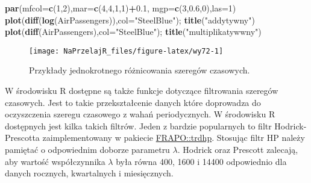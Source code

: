 \documentclass[polish,]{book}
\newenvironment{Shaded}{\begin{snugshade}}{\end{snugshade}}
\newcommand{\DataTypeTok}[1]{\textcolor[rgb]{0.13,0.29,0.53}{#1}}
\newcommand{\DecValTok}[1]{\textcolor[rgb]{0.00,0.00,0.81}{#1}}
\newcommand{\FloatTok}[1]{\textcolor[rgb]{0.00,0.00,0.81}{#1}}
\newcommand{\KeywordTok}[1]{\textcolor[rgb]{0.13,0.29,0.53}{\textbf{#1}}}
\newcommand{\NormalTok}[1]{#1}
\newcommand{\OperatorTok}[1]{\textcolor[rgb]{0.81,0.36,0.00}{\textbf{#1}}}
\newcommand{\StringTok}[1]{\textcolor[rgb]{0.31,0.60,0.02}{#1}}
\begin{document}
\begin{Shaded}
\begin{Highlighting}[]
\KeywordTok{par}\NormalTok{(}\DataTypeTok{mfcol=}\KeywordTok{c}\NormalTok{(}\DecValTok{1}\NormalTok{,}\DecValTok{2}\NormalTok{),}\DataTypeTok{mar=}\KeywordTok{c}\NormalTok{(}\DecValTok{4}\NormalTok{,}\DecValTok{4}\NormalTok{,}\DecValTok{1}\NormalTok{,}\DecValTok{1}\NormalTok{)}\OperatorTok{+}\FloatTok{0.1}\NormalTok{, }\DataTypeTok{mgp=}\KeywordTok{c}\NormalTok{(}\DecValTok{3}\NormalTok{,}\FloatTok{0.6}\NormalTok{,}\DecValTok{0}\NormalTok{),}\DataTypeTok{las=}\DecValTok{1}\NormalTok{)}
\KeywordTok{plot}\NormalTok{(}\KeywordTok{diff}\NormalTok{(}\KeywordTok{log}\NormalTok{(AirPassengers)),}\DataTypeTok{col=}\StringTok{"SteelBlue"}\NormalTok{); }\KeywordTok{title}\NormalTok{(}\StringTok{"addytywny"}\NormalTok{)}
\KeywordTok{plot}\NormalTok{(}\KeywordTok{diff}\NormalTok{(AirPassengers),}\DataTypeTok{col=}\StringTok{"SteelBlue"}\NormalTok{); }\KeywordTok{title}\NormalTok{(}\StringTok{"multiplikatywwny"}\NormalTok{)}
\end{Highlighting}
\end{Shaded}

\begin{figure}[h]

{\centering \texttt{[image: NaPrzelajR\_files/figure-latex/wy72-1]} 

}

\caption{Przykłady jednokrotnego różnicowania szeregów czasowych.}\label{fig:wy72}
\end{figure}

W środowisku R dostępne są także funkcje dotyczące filtrowania szeregów czasowych. Jest to takie przekształcenie danych które doprowadza do oczyszczenia szeregu
czasowego z wahań periodycznych. W środowisku R dostępnych jest kilka takich
filtrów. Jeden z bardzie popularnych to filtr Hodrick-Prescotta zaimplementowany w pakiecie \href{https://rdrr.io/cran/FRAPO/man/trdhp.html}{FRAPO::trdhp}. Stosując filtr HP należy pamiętać o odpowiednim doborze parametru \(\lambda\). Hodrick oraz Prescott zalecają, aby wartość współczynnika \(\lambda\) była równa 400, 1600 i 14400
odpowiednio dla danych rocznych, kwartalnych i miesięcznych.
\end{document}
